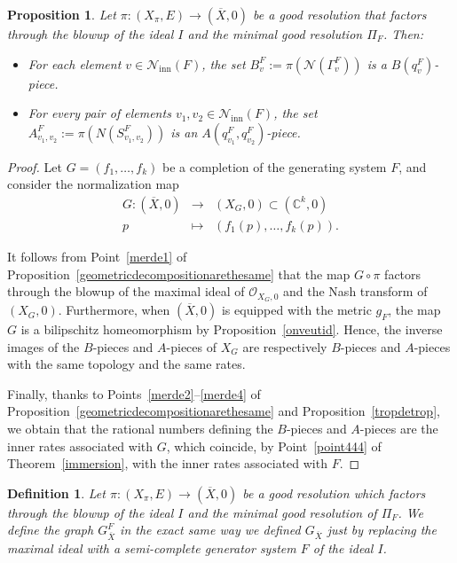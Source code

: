 \documentclass[reqno,dvipsnames,12pt]{amsart}
\newtheorem{prop}[thm]{Proposition}
\newtheorem{defi}[thm]{Definition}
\begin{document}
\begin{prop}
Let $\pi: (X_{\pi},E) \longrightarrow (\overline{X},0)$ be a good resolution that factors through the blowup of the ideal $I$ and the minimal good resolution  $\Pi_F$. Then:  
\begin{itemize}
    \item For each element $v \in \mathcal{N}_{\mathrm{inn}}(F)$, the set $B_v^{F} := \pi(\mathcal{N}(\Gamma_v^F))$ is a $B(q_v^{F})$-piece.
    \item For every pair of elements $v_1, v_2 \in \mathcal{N}_{\mathrm{inn}}(F)$, the set $A_{v_1,v_2}^{F} := \pi(N(S_{v_1,v_2}^F))$ is an $A(q_{v_1}^{F}, q_{v_2}^{F})$-piece.
\end{itemize}
\end{prop}
\begin{proof}
Let $G=(f_1,\dots,f_k)$ be a completion of the generating system $F$, and consider the normalization map
\[
\begin{array}{ccc}
G : (\overline{X},0) & \longrightarrow & (X_G,0) \subset (\mathbb{C}^{k},0) \\
p & \longmapsto & (f_1(p), \dots, f_k(p)).
\end{array}
\]

It follows from Point~\ref{merde1} of Proposition~\ref{geometricdecompositionarethesame} that the map $G \circ \pi$ factors through the blowup of the maximal ideal of $\mathcal{O}_{X_G,0}$ and the Nash transform of $(X_G,0)$. Furthermore, when $(\overline{X},0)$ is equipped with the metric $g_F$, the map $G$ is a bilipschitz homeomorphism by Proposition~\ref{onveutid}. Hence, the inverse images of the $B$-pieces and $A$-pieces of $X_G$ are respectively $B$-pieces and $A$-pieces with the same topology and the same rates.

Finally, thanks to Points~\ref{merde2}--\ref{merde4} of Proposition~\ref{geometricdecompositionarethesame} and Proposition~\ref{tropdetrop}, we obtain that the rational numbers defining the $B$-pieces and $A$-pieces are the inner rates associated with $G$, which coincide, by Point~\ref{point444} of Theorem~\ref{immersion}, with the inner rates associated with $F$.
\end{proof}

\begin{defi}
   Let $\pi:(X_{\pi},E) \longrightarrow (\overline{X},0)$ be a good resolution which factors through the blowup of the ideal $I$ and the minimal good resolution of $\Pi_F$. We define the graph $G_{\overline{X}}^{F}$ in the exact same way we defined $G_{\overline{X}}$ just by replacing the maximal ideal with a semi-complete generator system $F$ of the ideal $I$.
\end{defi}
\end{document}
